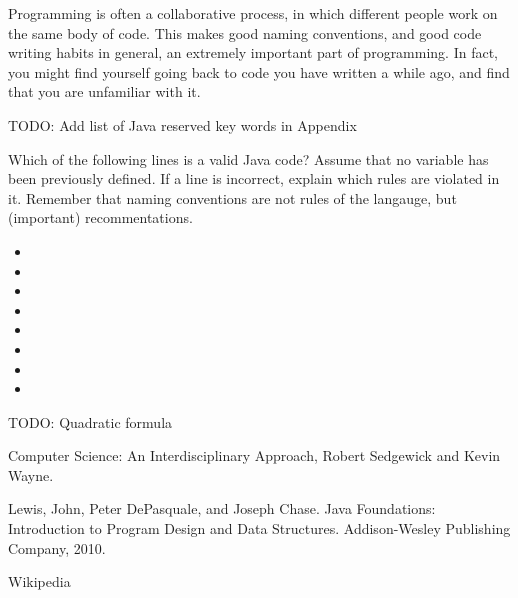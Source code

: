 Programming is often a collaborative process, in which different people work on the same body of code. This makes good naming conventions, and good code writing habits in general, an extremely important part of programming. In fact, you might find yourself going back to code you have written a while ago, and find that you are unfamiliar with it.

TODO: Add list of Java reserved key words in Appendix

\exercisesection

\begin{exercise}
Which of the following lines is a valid Java code? Assume that no variable has been previously defined. If a line is incorrect, explain which rules are violated in it. Remember that naming conventions are not rules of the langauge, but (important) recommentations.
\begin{itemize}
\item {}
\item {}
\item {}
\item {}
\item {}
\item {}
\item {}
\item {}
\end{itemize}
\end{exercise}

\begin{exercise}
TODO: Quadratic formula
\end{exercise}


Computer Science: An Interdisciplinary Approach, Robert Sedgewick and Kevin Wayne.

Lewis, John, Peter DePasquale, and Joseph Chase. Java Foundations: Introduction to Program Design and Data Structures. Addison-Wesley Publishing Company, 2010.

Wikipedia

